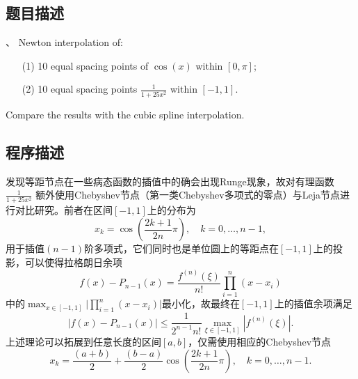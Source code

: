 \subsection{题目描述}、
\label{sec:problem_1}
\noindent Newton interpolation of:
\begin{itemize}
    \item[(1)] 10 equal spacing points of \( \cos(x) \) within \( [0, \pi] \);
    \item[(2)] 10 equal spacing points \( \frac{1}{1 + 25x^2} \) within \([-1, 1]\).
\end{itemize}
Compare the results with the cubic spline interpolation.

\subsection{程序描述}
发现等距节点在一些病态函数的插值中的确会出现Runge现象，故对有理函数\( \frac{1}{1 + 25x^2} \) 额外使用Chebyshev节点（第一类Chebyshev多项式的零点）与Leja节点进行对比研究。前者在区间\([-1, 1]\)上的分布为
\[x_k=\cos{\left(\frac{2k+1}{2n}\pi\right)},\quad k=0,\ldots,n-1,\]
用于插值\((n-1)\)阶多项式，它们同时也是单位圆上的等距点在\([-1, 1]\)上的投影，可以使得拉格朗日余项
\[f(x)-P_{n-1}(x)=\frac{f^{(n)}(\xi)}{n!}\prod_{i=1}^n(x-x_i)\]
中的\(\max_{x\in[-1,1]}\Big|\prod_{i=1}^n(x-x_i)\Big|\)最小化，故最终在\([-1, 1]\)上的插值余项满足
\[|f(x)-P_{n-1}(x)|\leq\frac1{2^{n-1}n!}\max_{\xi\in[-1,1]}\left|f^{(n)}(\xi)\right|.\]上述理论可以拓展到任意长度的区间\([a,b]\)，仅需使用相应的Chebyshev节点
\[x_k=\frac{(a+b)}2+\frac{(b-a)}2\cos\left(\frac{2k+1}{2n}\pi\right),\quad k=0,\ldots,n-1.\]


